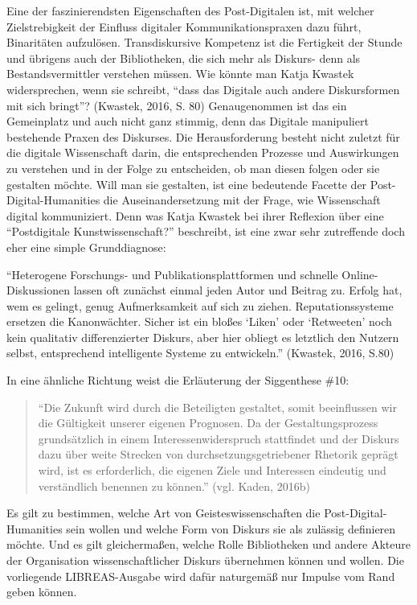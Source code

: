 \documentclass[a4paper,
fontsize=11pt,
oneside,
numbers=noperiodatend,
parskip=half-,
bibliography=totoc,
final
]{scrartcl}
\begin{document}
Eine der faszinierendsten Eigenschaften des Post-Digitalen ist, mit
welcher Zielstrebigkeit der Einfluss digitaler Kommunikationspraxen dazu
führt, Binaritäten aufzulösen. Transdiskursive Kompetenz ist die
Fertigkeit der Stunde und übrigens auch der Bibliotheken, die sich mehr
als Diskurs- denn als Bestandsvermittler verstehen müssen. Wie könnte
man Katja Kwastek widersprechen, wenn sie schreibt, \enquote{dass das
Digitale auch andere Diskursformen mit sich bringt}? (Kwastek, 2016, S.
80) Genaugenommen ist das ein Gemeinplatz und auch nicht ganz stimmig,
denn das Digitale manipuliert bestehende Praxen des Diskurses. Die
Herausforderung besteht nicht zuletzt für die digitale Wissenschaft
darin, die entsprechenden Prozesse und Auswirkungen zu verstehen und in
der Folge zu entscheiden, ob man diesen folgen oder sie gestalten
möchte. Will man sie gestalten, ist eine bedeutende Facette der
Post-Digital-Humanities die Auseinandersetzung mit der Frage, wie
Wissenschaft digital kommuniziert. Denn was Katja Kwastek bei ihrer
Reflexion über eine \enquote{Postdigitale Kunstwissenschaft?}
beschreibt, ist eine zwar sehr zutreffende doch eher eine simple
Grunddiagnose:

\enquote{Heterogene Forschungs- und Publikationsplattformen und schnelle
Online-Diskussionen lassen oft zunächst einmal jeden Autor und Beitrag
zu. Erfolg hat, wem es gelingt, genug Aufmerksamkeit auf sich zu ziehen.
Reputationssysteme ersetzen die Kanonwächter. Sicher ist ein bloßes
\enquote{Liken} oder \enquote{Retweeten} noch kein qualitativ
differenzierter Diskurs, aber hier obliegt es letztlich den Nutzern
selbst, entsprechend intelligente Systeme zu entwickeln.} (Kwastek,
2016, S.80)

In eine ähnliche Richtung weist die Erläuterung der Siggenthese \#10:

\begin{quote}
\enquote{Die Zukunft wird durch die Beteiligten gestaltet, somit
beeinflussen wir die Gültigkeit unserer eigenen Prognosen. Da der
Gestaltungsprozess grundsätzlich in einem Interessenwiderspruch
stattfindet und der Diskurs dazu über weite Strecken von
durchsetzungsgetriebener Rhetorik geprägt wird, ist es erforderlich, die
eigenen Ziele und Interessen eindeutig und verständlich benennen zu
können.} (vgl. Kaden, 2016b)
\end{quote}

Es gilt zu bestimmen, welche Art von Geisteswissenschaften die
Post-Digital-Humanities sein wollen und welche Form von Diskurs sie als
zulässig definieren möchte. Und es gilt gleichermaßen, welche Rolle
Bibliotheken und andere Akteure der Organisation wissenschaftlicher
Diskurs übernehmen können und wollen. Die vorliegende LIBREAS-Ausgabe
wird dafür naturgemäß nur Impulse vom Rand geben können.
\end{document}
